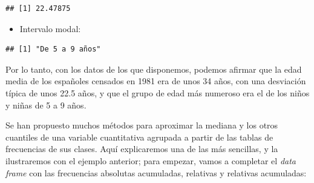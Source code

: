 \documentclass[]{book}
\newenvironment{Shaded}{\begin{snugshade}}{\end{snugshade}}
\newcommand{\DataTypeTok}[1]{\textcolor[rgb]{0.13,0.29,0.53}{#1}}
\newcommand{\DecValTok}[1]{\textcolor[rgb]{0.00,0.00,0.81}{#1}}
\newcommand{\KeywordTok}[1]{\textcolor[rgb]{0.13,0.29,0.53}{\textbf{#1}}}
\newcommand{\NormalTok}[1]{#1}
\newcommand{\OperatorTok}[1]{\textcolor[rgb]{0.81,0.36,0.00}{\textbf{#1}}}
\providecommand{\tightlist}{%
  \setlength{\itemsep}{0pt}\setlength{\parskip}{0pt}}
\theoremstyle{definition}
\theoremstyle{definition}
\theoremstyle{definition}
\theoremstyle{remark}
\begin{document}
\begin{verbatim}
## [1] 22.47875
\end{verbatim}

\begin{itemize}
\tightlist
\item
  Intervalo modal:
\end{itemize}

\begin{Shaded}
\end{Shaded}

\begin{verbatim}
## [1] "De 5 a 9 años"
\end{verbatim}

Por lo tanto, con los datos de los que disponemos, podemos afirmar que la edad media de los españoles censados en 1981 era de unos 34 años, con una desviación típica de unos 22.5 años, y que el grupo de edad más numeroso era el de los niños y niñas de 5 a 9 años.

Se han propuesto muchos métodos para aproximar la mediana y los otros cuantiles de una variable cuantitativa agrupada a partir de las tablas de frecuencias de sus clases. Aquí explicaremos una de las más sencillas, y la ilustraremos con el ejemplo anterior; para empezar, vamos a completar el \emph{data frame} con las frecuencias absolutas acumuladas, relativas y relativas acumuladas:

\begin{Shaded}
\end{Shaded}
\end{document}
